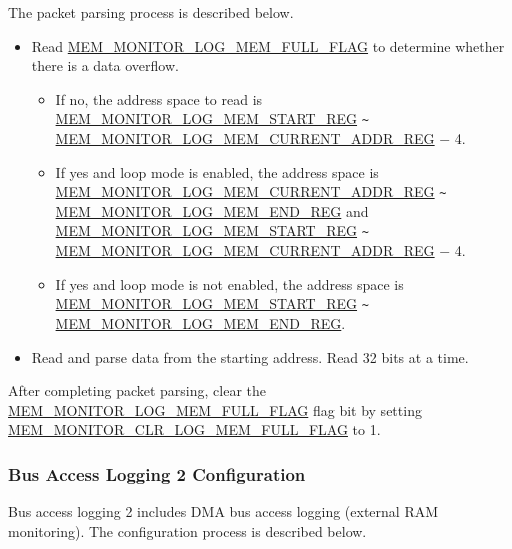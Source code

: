 \documentclass[main\_\_EN.tex]{subfiles}
\begin{document}
The packet parsing process is described below.

\begin{itemize}
    \item Read \hyperref[fielddesc:MEMMONITORLOGMEMFULLFLAG]{MEM\_MONITOR\_LOG\_MEM\_FULL\_FLAG} to determine whether there is a data overflow.
    \begin{itemize}
        \item If no, the address space to read is \hyperref[regdesc:MEMMONITORLOGMEMSTARTREG]{MEM\_MONITOR\_LOG\_MEM\_START\_REG} \verb+~+ \hyperref[regdesc:MEMMONITORLOGMEMCURRENTADDRREG]{MEM\_MONITOR\_LOG\_MEM\_CURRENT\_ADDR\_REG} $-$ 4.
        \item If yes and loop mode is enabled, the address space is \hyperref[regdesc:MEMMONITORLOGMEMCURRENTADDRREG]{MEM\_MONITOR\_LOG\_MEM\_CURRENT\_ADDR\_REG} \verb+~+ \hyperref[regdesc:MEMMONITORLOGMEMENDREG]{MEM\_MONITOR\_LOG\_MEM\_END\_REG} and \hyperref[regdesc:MEMMONITORLOGMEMSTARTREG]{MEM\_MONITOR\_LOG\_MEM\_START\_REG} \verb+~+ \hyperref[regdesc:MEMMONITORLOGMEMCURRENTADDRREG]{MEM\_MONITOR\_LOG\_MEM\_CURRENT\_ADDR\_REG} $-$ 4.
        \item If yes and loop mode is not enabled, the address space is \hyperref[regdesc:MEMMONITORLOGMEMSTARTREG]{MEM\_MONITOR\_LOG\_MEM\_START\_REG} \verb+~+ \hyperref[regdesc:MEMMONITORLOGMEMENDREG]{MEM\_MONITOR\_LOG\_MEM\_END\_REG}.
    \end{itemize}
    \item Read and parse data from the starting address. Read 32 bits at a time.
\end{itemize}

After completing packet parsing, clear the \hyperref[fielddesc:MEMMONITORLOGMEMFULLFLAG]{MEM\_MONITOR\_LOG\_MEM\_FULL\_FLAG} flag bit by setting \hyperref[fielddesc:MEMMONITORCLRLOGMEMFULLFLAG]{MEM\_MONITOR\_CLR\_LOG\_MEM\_FULL\_FLAG} to 1.

\subsubsection{Bus Access Logging 2 Configuration}

Bus access logging 2 includes DMA bus access logging (external RAM monitoring). The configuration process is described below.
\end{document}
